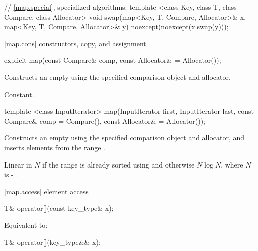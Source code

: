 \begin{codeblock}
{  // \ref{map.special}, specialized algorithms:
  template <class Key, class T, class Compare, class Allocator>
    void swap(map<Key, T, Compare, Allocator>& x,
              map<Key, T, Compare, Allocator>& y)
      noexcept(noexcept(x.swap(y)));
}
\end{codeblock}


[map.cons]{ constructors, copy, and assignment}%
%

%
\begin{itemdecl}
explicit map(const Compare& comp, const Allocator& = Allocator());
\end{itemdecl}

\begin{itemdescr}
\pnum
\effects
Constructs an empty
using the specified comparison object and allocator.

\pnum
\complexity
Constant.
\end{itemdescr}

%
\begin{itemdecl}
template <class InputIterator>
  map(InputIterator first, InputIterator last,
      const Compare& comp = Compare(), const Allocator& = Allocator());
\end{itemdecl}

\begin{itemdescr}
\pnum
\effects
Constructs an empty
using the specified comparison object and allocator,
and inserts elements from the range
.

\pnum
\complexity
Linear in $N$ if the range
is already sorted using 
and otherwise $N \log{N}$, where $N$
is  - .
\end{itemdescr}

[map.access]{ element access}

%
\begin{itemdecl}
T& operator[](const key_type& x);
\end{itemdecl}

\begin{itemdescr}
\pnum
\effects
Equivalent to: 
\end{itemdescr}

%
\begin{itemdecl}
T& operator[](key_type&& x);
\end{itemdecl}

